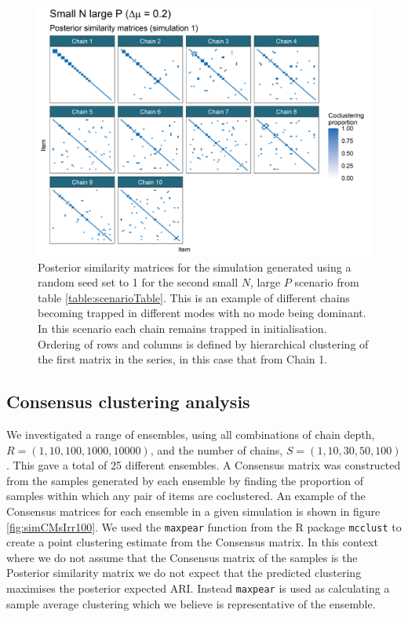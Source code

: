 \documentclass[]{article}
\begin{document}
\begin{figure} %
	\centering
	\includegraphics[scale=0.65]{./Images/Simulations/PSMs/small_n_large_p_small_dmSim1.png}
	\caption{Posterior similarity matrices for the simulation generated using a random seed set to 1 for the second small $N$, large $P$ scenario from table \ref{table:scenarioTable}. This is an example of different chains becoming trapped in different modes with no mode being dominant. In this scenario each chain remains trapped in initialisation. Ordering of rows and columns is defined by hierarchical clustering of the first matrix in the series, in this case that from Chain 1.}
	\label{fig:simPSMsPathologicalDisagreeExample}
\end{figure}


\subsection{Consensus clustering analysis} 
We investigated a range of ensembles, using all combinations of chain depth, $R=(1, 10, 100, 1000, 10000)$, and the number of chains, $S=(1, 10, 30, 50, 100)$. This gave a total of 25 different ensembles. A Consensus matrix was constructed from the samples generated by each ensemble by finding the proportion of samples within which any pair of items are coclustered. An example of the Consensus matrices for each ensemble in a given simulation is shown in figure \ref{fig:simCMsIrr100}. We used the \texttt{maxpear} function from the R package \texttt{mcclust} to create a point clustering estimate from the Consensus matrix. In this context where we do not assume that the Consensus matrix of the samples is the Posterior similarity matrix we do not expect that the predicted clustering maximises the posterior expected ARI. Instead \texttt{maxpear} is used as calculating a sample average clustering which we believe is representative of the ensemble.
\end{document}
